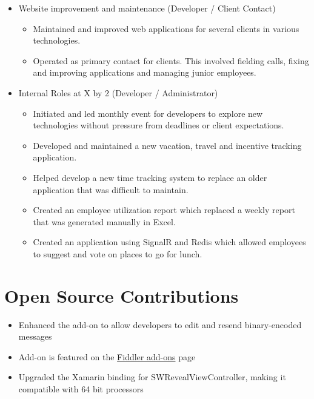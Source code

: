 \documentclass[12pt,letterpaper,sans]{moderncv}
\begin{document}
\begin{itemize}[leftmargin=1.24in]
\begin{itemize}
            \end{itemize}
        \item Website improvement and maintenance (Developer / Client Contact)
        	\begin{itemize}
        		\item Maintained and improved web applications for several clients in various technologies.
        		\item Operated as primary contact for clients. This involved fielding calls, fixing and improving applications and managing junior employees.
        	\end{itemize}
        \item Internal Roles at X by 2 (Developer / Administrator)
            \begin{itemize}
            	\item Initiated and led monthly event for developers to explore new technologies without pressure from deadlines or client expectations.
                \item Developed and maintained a new vacation, travel and incentive tracking application.
                \item Helped develop a new time tracking system to replace an older application that was difficult to maintain.
                \item Created an employee utilization report which replaced a weekly report that was generated manually in Excel.
                \item Created an application using SignalR and Redis which allowed employees to suggest and vote on places to go for lunch.
            \end{itemize}
    \end{itemize}
    
\section{Open Source Contributions}
	\begin{itemize}[leftmargin=1.24in]
		\item Enhanced the add-on to allow developers to edit and resend binary-encoded messages
		\item Add-on is featured on the \href{www.telerik.com/fiddler/add-ons}{Fiddler add-ons} page
	\end{itemize}
	\begin{itemize}[leftmargin=1.24in]
		\item Upgraded the Xamarin binding for SWRevealViewController, making it compatible with 64 bit processors
	\end{itemize}
\end{document}
